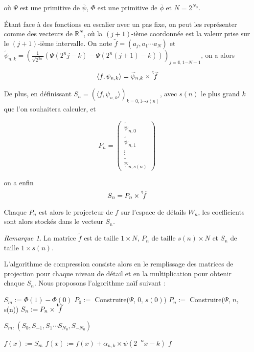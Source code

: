 \documentclass[]{article}
\theoremstyle{remark}
\newtheorem{myrem}{Remarque}
\theoremstyle{definition}
\newcommand{\DS}{\displaystyle}
\newcommand*{\transp}[2][-3mu]{\ensuremath{\mskip1mu\prescript{\smash{\mathrm t\mkern#1}}{}{\mathstrut#2}}}%
\begin{document}
où $\Psi$ est une primitive de $\overline{\psi}$, $\Phi$ est une primitive de $\overline{\phi}$ et $N = 2^{N_0}$.

Étant face à des fonctions en escalier avec un pas fixe, on peut les représenter comme des vecteurs de $\mathbb{R}^N$, où la $(j+1)$-ième coordonnée est la valeur prise sur le $(j+1)$-ième intervalle. On note $\tilde{f} = (a_j, a_1 \cdots a_N)$ et $\DS \widetilde{\psi}_{n, k} = \left(\frac{1}{\sqrt{2^{3n}}} (\Psi(2^n j - k) - \Psi(2^n (j+1) - k))\right)_{j = 0, 1 \cdots N - 1}$, on a alors 

$$\langle f, \psi_{n, k} \rangle =\widetilde{\psi}_{n, k} \times \transp{\widetilde{f}}$$

De plus, en définissant $S_n = (\langle f, \psi_{n, k}\rangle)_{k = 0, 1 \cdots s(n)}$, avec $s(n)$ le plus grand $k$ que l'on souhaitera calculer, et

$$P_n = 
\left(
	\begin{array}{c}
		\widetilde{\psi}_{n, 0} \\
		\widetilde{\psi}_{n, 1} \\
		\vdots \\
		\widetilde{\psi}_{n, s(n)} 
	\end{array}
\right)$$

on a enfin $$S_n = P_n\times\transp{\tilde{f} }$$

Chaque $P_n$ est alors le projecteur de $f$ sur l'espace de détails $W_n$, les coefficients sont alors stockés dans le vecteur $S_n$.

\begin{myrem}
	La matrice $\widetilde{f}$ est de taille $1 \times N$, $P_n$ de taille $s(n) \times N$ et $S_n$ de taille $1 \times s(n)$.
\end{myrem}

L'algorithme de compression consiste alors en le remplissage des matrices de projection pour chaque niveau de détail et en la multiplication pour obtenir chaque $S_n$. Nous proposons l'algorithme naïf suivant :

\begin{algorithm}
	\begin{algorithmic}[1]
			\State $S_m := \Phi(1)-\Phi(0)$
			\State $P_0 := $ Construire($\Psi$, 0, $s(0)$)
				\State $P_n :=$ Construire($\Psi$, $n$, s(n))
				\State $S_n := P_n\times \transp{\widetilde{f}}$
		
			\EndFor
			\State \Return $S_m,(S_0, S_{-1}, S_{1} \cdots S_{N_0}, S_{-N_0})$
		\EndProcedure

		\Statex

		\State $f(x) := S_m$
		\State $f(x) := f(x) + \alpha_{n, k} \times \psi(2^{-n} x - k)$
		\EndFor
		\EndFor
		\EndFor
		\State \Return $f$
		\EndProcedure
	\end{algorithmic}
\end{algorithm}
\end{document}
